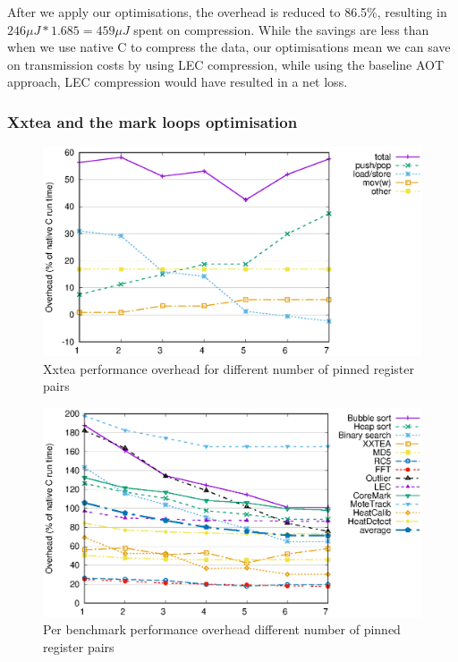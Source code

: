 After we apply our optimisations, the overhead is reduced to 86.5\%, resulting in $246 \mu J * 1.685 = 459 \mu J$ spent on compression. While the savings are less than when we use native C to compress the data, our optimisations mean we can save on transmission costs by using LEC compression, while using the baseline AOT approach, LEC compression would have resulted in a net loss.

\subsubsection{Xxtea and the mark loops optimisation}

\begin{figure}
\centering
\includegraphics[width=\mygraphsize]{pinnedregs-performance-xxtea.eps}
\caption{Xxtea performance overhead for different number of pinned register pairs}
\label{fig-performance-pinnedregs-xxtea-per-opcode-category}
\end{figure}

\begin{figure}
\centering
\includegraphics[width=\mygraphsize]{pinnedregs-performance-all-benchmarks.eps}
\caption{Per benchmark performance overhead different number of pinned register pairs}
\label{fig-performance-pinnedregs-per-benchmark}
\end{figure}

